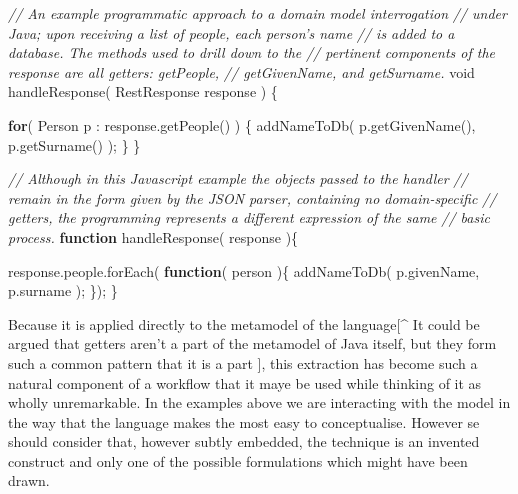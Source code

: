 \documentclass[]{article}
\newenvironment{Shaded}{}{}
\newcommand{\KeywordTok}[1]{\textcolor[rgb]{0.00,0.44,0.13}{\textbf{{#1}}}}
\newcommand{\DataTypeTok}[1]{\textcolor[rgb]{0.56,0.13,0.00}{{#1}}}
\newcommand{\CommentTok}[1]{\textcolor[rgb]{0.38,0.63,0.69}{\textit{{#1}}}}
\newcommand{\OtherTok}[1]{\textcolor[rgb]{0.00,0.44,0.13}{{#1}}}
\newcommand{\FunctionTok}[1]{\textcolor[rgb]{0.02,0.16,0.49}{{#1}}}
\newcommand{\NormalTok}[1]{{#1}}
\begin{document}
\begin{Shaded}
\begin{Highlighting}[]
\CommentTok{// An example programmatic approach to a domain model interrogation }
\CommentTok{// under Java; upon receiving a list of people, each person's name}
\CommentTok{// is added to a database. The methods used to drill down to the}
\CommentTok{// pertinent components of the response are all getters: getPeople, }
\CommentTok{// getGivenName, and getSurname. }
\DataTypeTok{void} \FunctionTok{handleResponse}\NormalTok{( RestResponse response ) \{}

   \KeywordTok{for}\NormalTok{( Person p : response.}\FunctionTok{getPeople}\NormalTok{() ) \{}
      \FunctionTok{addNameToDb}\NormalTok{( p.}\FunctionTok{getGivenName}\NormalTok{(), p.}\FunctionTok{getSurname}\NormalTok{() );}
   \NormalTok{\}   }
\NormalTok{\}}
\end{Highlighting}
\end{Shaded}

\begin{Shaded}
\begin{Highlighting}[]
\CommentTok{// Although in this Javascript example the objects passed to the handler }
\CommentTok{// remain in the form given by the JSON parser, containing no domain-specific}
\CommentTok{// getters, the programming represents a different expression of the same }
\CommentTok{// basic process.}
\KeywordTok{function} \FunctionTok{handleResponse}\NormalTok{( response )\{}

   \OtherTok{response}\NormalTok{.}\OtherTok{people}\NormalTok{.}\FunctionTok{forEach}\NormalTok{( }\KeywordTok{function}\NormalTok{( person )\{}
      \FunctionTok{addNameToDb}\NormalTok{( }\OtherTok{p}\NormalTok{.}\FunctionTok{givenName}\NormalTok{, }\OtherTok{p}\NormalTok{.}\FunctionTok{surname} \NormalTok{);}
   \NormalTok{\});}
\NormalTok{\}}
\end{Highlighting}
\end{Shaded}

Because it is applied directly to the metamodel of the language{[}\^{}
It could be argued that getters aren't a part of the metamodel of Java
itself, but they form such a common pattern that it is a part {]}, this
extraction has become such a natural component of a workflow that it
maye be used while thinking of it as wholly unremarkable. In the
examples above we are interacting with the model in the way that the
language makes the most easy to conceptualise. However se should
consider that, however subtly embedded, the technique is an invented
construct and only one of the possible formulations which might have
been drawn.
\end{document}
